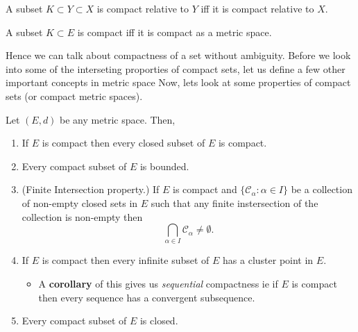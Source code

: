 \begin{Theorem}[name=Compactness is inherent]
    A subset $K \subset Y \subset X$ is compact relative to $Y$ iff it is compact relative to $X$. 
\end{Theorem}
\begin{Corollary}
    A subset $K \subset E$ is compact iff it is compact as a metric space.
\end{Corollary}
Hence we can talk about compactness of a set without ambiguity. 
Before we look into some of the
interseting proporties of compact sets, let us define a few other important concepts in metric space
Now, lets look at some properties of compact sets (or compact metric spaces).
\begin{Proposition}[name=Properties of compact sets]
    Let $(E,d)$ be any metric space. Then,
    \begin{enumerate}
	\item If $E$ is compact then every closed subset of $E$ is compact.
	\item Every compact subset of $E$ is bounded.
	\item (Finite Intersection property.) If $E$ is compact and $\left.\lbrace 
		\mathcal{C}_{\alpha} : 
		\alpha \in I \rbrace\right.$ be a collection of non-empty closed sets in $E$ such
	    that any finite instersection of the collection is non-empty then \[ \bigcap_{\alpha \in
		    I}\mathcal{C}_{\alpha} \neq \emptyset.\] 
	\item If $E$ is compact then every infinite subset of $E$ has a cluster point in $E$.
	    \begin{itemize}
		\item
		    A \textbf{corollary} of this gives us \emph{sequential} compactness ie if $E$ is
		    compact then every sequence has a convergent subsequence.
	    \end{itemize}
	\item Every compact subset of $E$ is closed.
    \end{enumerate}
\end{Proposition}
